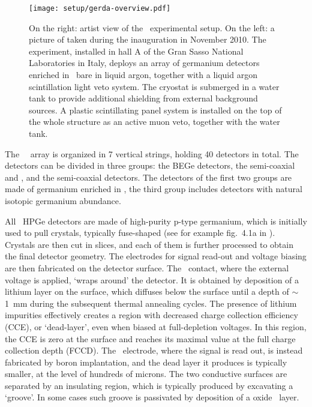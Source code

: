 \begin{figure}
  \centering
  \texttt{[image: setup/gerda-overview.pdf]}
  \caption{%
    On the right: artist view of the \gerda\ experimental setup. On the left: a picture of
    taken during the inauguration in November 2010. The experiment, installed in hall A of
    the Gran Sasso National Laboratories in Italy, deploys an array of germanium detectors
    enriched in \gesix\ bare in liquid argon, together with a liquid argon scintillation
    light veto system. The cryostat is submerged in a water tank to provide additional
    shielding from external background sources. A plastic scintillating panel system is
    installed on the top of the whole structure as an active muon veto, together with the
    water tank.
  }\label{fig:setup:overview}
\end{figure}

The \gerda\ \phasetwo\ array is organized in 7 vertical strings, holding 40 detectors in
total. The detectors can be divided in three groups: the BEGe detectors, the semi-coaxial
 and , and the semi-coaxial  detectors. The detectors of the first two
groups are made of germanium enriched in \gesix, the third group includes detectors with
natural isotopic germanium abundance.

All \gerda\ HPGe detectors are made of high-purity p-type germanium, which is initially
used to pull crystals, typically fuse-shaped (see for example fig.~4.1a in
\cite{Yonenaga2019}).  Crystals are then cut in slices, and each of them is further
processed to obtain the final detector geometry. The electrodes for signal read-out and
voltage biasing are then fabricated on the detector surface. The \nplus\ contact, where the
external voltage is applied, `wraps around' the detector. It is obtained by deposition of
a lithium layer on the surface, which diffuses below the surface until a depth of
$\sim$1~mm during the subsequent thermal annealing cycles. The presence of lithium
impurities effectively creates a region with decreased charge collection efficiency (CCE),
or `dead-layer', even when biased at full-depletion voltages.  In this region, the CCE is
zero at the surface and reaches its maximal value at the full charge collection depth
(FCCD). The \pplus\ electrode, where the signal is read out, is instead fabricated by boron
implantation, and the dead layer it produces is typically smaller, at the level of
hundreds of microns. The two conductive surfaces are separated by an insulating region,
which is typically produced by excavating a `groove'. In some cases such groove is
passivated by deposition of a oxide \fillme\ layer.

